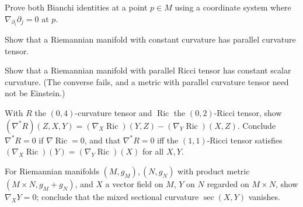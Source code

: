 \begin{remark}
  \label{rem:pet-ch3-ex-5}
  \leanok
  Prove both Bianchi identities at a point $p\in M$ using a coordinate system
  where $\nabla_{\partial_i}\partial_j=0$ at $p$.
\end{remark}

\begin{remark}
  \label{rem:pet-ch3-ex-6}
  \leanok
  Show that a Riemannian manifold with constant curvature has parallel curvature
  tensor.
\end{remark}

\begin{remark}
  \label{rem:pet-ch3-ex-7}
  \leanok
  Show that a Riemannian manifold with parallel Ricci tensor has constant scalar
  curvature. (The converse fails, and a metric with parallel curvature tensor
  need not be Einstein.)
\end{remark}

\begin{remark}
  \label{rem:pet-ch3-ex-8}
  \leanok
  With $R$ the $(0,4)$-curvature tensor and $\operatorname{Ric}$ the
  $(0,2)$-Ricci tensor, show
  $(\nabla^*R)(Z,X,Y)=(\nabla_X\operatorname{Ric})(Y,Z)-(\nabla_Y\operatorname{Ric})(X,Z)$.
  Conclude $\nabla^*R=0$ if $\nabla\operatorname{Ric}=0$, and that $\nabla^*R=0$
  iff the $(1,1)$-Ricci tensor satisfies $(\nabla_X\operatorname{Ric})(Y)=(\nabla_Y\operatorname{Ric})(X)$
  for all $X,Y$.
\end{remark}

\begin{remark}
  \label{rem:pet-ch3-ex-9}
  \leanok
  For Riemannian manifolds $(M,g_M),(N,g_N)$ with product metric
  $(M\times N,g_M+g_N)$, and $X$ a vector field on $M$, $Y$ on $N$ regarded on
  $M\times N$, show $\nabla_XY=0$; conclude that the mixed sectional curvature
  $\sec(X,Y)$ vanishes.
\end{remark}

